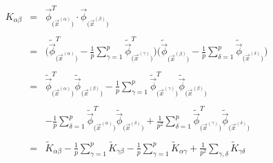 \begin{equation}
        \begin{array}{lll}
        K_{\alpha \beta}
        & = & \vec{\phi}_{\big( \vec{x}^{(\alpha)} \big)}^T
                \cdot \vec{\phi}_{\big( \vec{x}^{(\beta)} \big)}
                \\\\
        & = & \bigg( \widetilde{\vec{\phi}}_{\big( \vec{x}^{(\alpha)} \big)}^T
                - \frac{1}{p} \sum\limits_{\gamma = 1}^p 
                \widetilde{\vec{\phi}}_{\big( \vec{x}^{(\gamma)} \big)}^T
                \bigg) \bigg(\widetilde{\vec{\phi}}_{\big( \vec{x}^{(\beta)} 
                \big)} - \frac{1}{p} \sum\limits_{\delta = 1}^p 
                \widetilde{\vec{\phi}}_{\big( \vec{x}^{(\delta)} \big)} \bigg)
                \\\\
        & = & \widetilde{\vec{\phi}}_{\big( \vec{x}^{(\alpha)} \big)}^T
                \widetilde{\vec{\phi}}_{\big( \vec{x}^{(\beta)} \big)}
                - \frac{1}{p} \sum\limits_{\gamma = 1}^p 
                \widetilde{\vec{\phi}}_{\big( \vec{x}^{(\gamma)} \big)}^T
                \widetilde{\vec{\phi}}_{\big( \vec{x}^{(\beta)} \big)}
                \\\\
        && - \frac{1}{p} \sum\limits_{\delta = 1}^p 
                \widetilde{\vec{\phi}}_{\big( \vec{x}^{(\alpha)} \big)}^T
                \widetilde{\vec{\phi}}_{\big( \vec{x}^{(\delta)} \big)}
                + \frac{1}{p^2} \sum\limits_{\delta = 1}^p 
                \widetilde{\vec{\phi}}_{\big( \vec{x}^{(\gamma)} \big)}^T
                \widetilde{\vec{\phi}}_{\big( \vec{x}^{(\delta)} \big)}
                \\\\
        & = & \widetilde{K}_{\alpha \beta} - \frac{1}{p} 
                \sum\limits_{\gamma = 1}^p \widetilde{K}_{\gamma \beta}
                -\frac{1}{p} \sum\limits_{\gamma = 1}^p 
                \widetilde{K}_{\alpha \gamma} + \frac{1}{p^2} 
                \sum\limits_{\gamma, \delta} \widetilde{K}_{\gamma \delta}
        \end{array}
\end{equation}




